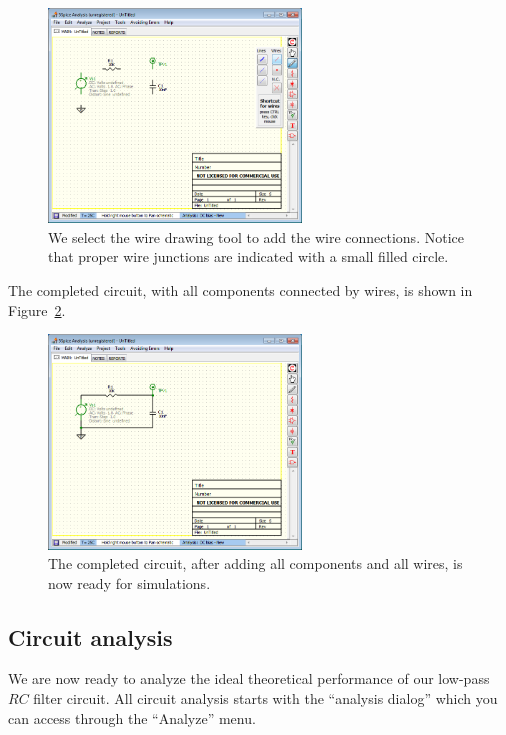 \documentclass{article}
\begin{document}
\begin{figure}
\begin{center}
\includegraphics[width=0.6\textwidth]{pics/5spice_adding_wires}
\end{center}
\caption{We select the wire drawing tool to add the wire connections.  Notice that proper wire junctions are indicated with a small filled circle.}
\label{fig:5spice:adding_wires}
\end{figure}

The completed circuit, with all components connected by wires, is shown in Figure~\ref{fig:5spice:added_wires}.

\begin{figure}
\begin{center}
\includegraphics[width=0.6\textwidth]{pics/5spice_added_wires}
\end{center}
\caption{The completed circuit, after adding all components and all wires, is now ready for simulations.}
\label{fig:5spice:added_wires}
\end{figure}


\subsection{Circuit analysis}
We are now ready to analyze the ideal theoretical performance of our low-pass $RC$ filter circuit. All circuit analysis starts with the ``analysis dialog'' which you can access through the ``Analyze'' menu.
\end{document}
